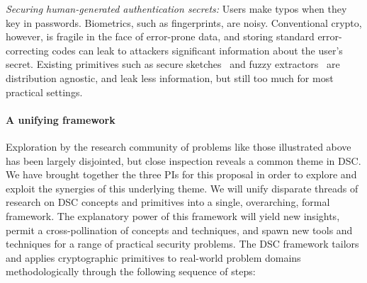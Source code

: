 \begin{newitemize}

\item{\em Securing human-generated authentication secrets:} Users make typos
when they key in passwords. Biometrics, such as fingerprints, are noisy.
Conventional crypto, however, is fragile in the face of error-prone data, and
storing standard error-correcting codes can leak to attackers significant
information about the user's secret. Existing primitives such as secure
sketches~\cite{} and fuzzy extractors~\cite{} are distribution agnostic, and
leak less information, but still too much for most practical settings. 
\end{newitemize}


\paragraph{A unifying framework}  Exploration by the research community of problems like those illustrated above has been largely disjointed, but close inspection reveals a common theme in DSC. We have brought
together the three PIs for this proposal in order to explore and exploit
the synergies of this underlying theme. We will unify disparate threads of research on DSC concepts and primitives into a single, overarching, formal framework. The explanatory power of this framework will yield new insights, permit a cross-pollination of concepts and techniques, and spawn new tools and techniques for a range of practical security problems. The DSC framework tailors and applies cryptographic primitives to real-world problem domains methodologically through the following sequence of steps:

